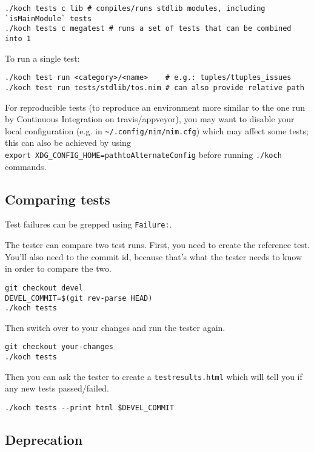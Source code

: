 \begin{verbatim}
./koch tests c lib # compiles/runs stdlib modules, including `isMainModule` tests
./koch tests c megatest # runs a set of tests that can be combined into 1
\end{verbatim}

To run a single test:

\begin{verbatim}
./koch test run <category>/<name>    # e.g.: tuples/ttuples_issues
./koch test run tests/stdlib/tos.nim # can also provide relative path
\end{verbatim}

For reproducible tests (to reproduce an environment more similar to the
one run by Continuous Integration on travis/appveyor), you may want to
disable your local configuration (e.g. in
\texttt{\textasciitilde{}/.config/nim/nim.cfg}) which may affect some
tests; this can also be achieved by using
\texttt{export\ XDG\_CONFIG\_HOME=pathtoAlternateConfig} before running
\texttt{./koch} commands.

\hypertarget{comparing-tests}{%
\subsection{Comparing tests}\label{comparing-tests}}

Test failures can be grepped using \texttt{Failure:}.

The tester can compare two test runs. First, you need to create the
reference test. You'll also need to the commit id, because that's what
the tester needs to know in order to compare the two.

\begin{verbatim}
git checkout devel
DEVEL_COMMIT=$(git rev-parse HEAD)
./koch tests
\end{verbatim}

Then switch over to your changes and run the tester again.

\begin{verbatim}
git checkout your-changes
./koch tests
\end{verbatim}

Then you can ask the tester to create a \texttt{testresults.html} which
will tell you if any new tests passed/failed.

\begin{verbatim}
./koch tests --print html $DEVEL_COMMIT
\end{verbatim}

\hypertarget{deprecation}{%
\subsection{Deprecation}\label{deprecation}}

